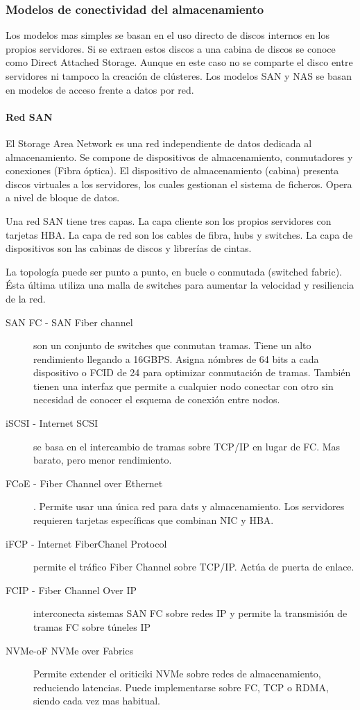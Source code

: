     \subsubsection{Modelos de conectividad del almacenamiento}
        Los modelos mas simples se basan en el uso directo de discos internos en los propios servidores. Si se extraen estos discos a una cabina de discos se conoce como Direct Attached Storage. Aunque en este caso no se comparte el disco entre servidores ni tampoco la creación de clústeres. Los modelos SAN y NAS se basan en modelos de acceso frente a datos por red.

        \paragraph{Red SAN}
            El Storage Area Network es una red independiente de datos dedicada al almacenamiento. Se compone de dispositivos de almacenamiento, conmutadores y conexiones (Fibra óptica). El dispositivo de almacenamiento (cabina) presenta discos virtuales a los servidores, los cuales gestionan el sistema de ficheros. Opera a nivel de bloque de datos.

            Una red SAN tiene tres capas. La capa cliente son los propios servidores con tarjetas HBA. La capa de red son los cables de fibra, hubs y switches. La capa de dispositivos son las cabinas de discos y librerías de cintas.

            La topología puede ser punto a punto, en bucle o conmutada (switched fabric). Ésta última utiliza una malla de switches para aumentar la velocidad y resiliencia de la red.

            \begin{description}
                \item[SAN FC - SAN Fiber channel] son un conjunto de switches que conmutan tramas. Tiene un alto rendimiento llegando a 16GBPS. Asigna nómbres de 64 bits a cada dispositivo o FCID de 24 para optimizar conmutación de tramas. También tienen una interfaz que permite a cualquier nodo conectar con otro sin necesidad de conocer el esquema de conexión entre nodos.
                \item[iSCSI - Internet SCSI] se basa en el intercambio de tramas sobre TCP/IP en lugar de FC. Mas barato, pero menor rendimiento.
                \item[FCoE - Fiber Channel over Ethernet]. Permite usar una única red para dats y almacenamiento. Los servidores requieren tarjetas específicas que combinan NIC y HBA.
                \item[iFCP - Internet FiberChanel Protocol] permite el tráfico Fiber Channel sobre TCP/IP. Actúa de puerta de enlace.
                \item[FCIP - Fiber Channel Over IP] interconecta sistemas SAN FC sobre redes IP y permite la transmisión de tramas FC sobre túneles IP
                \item[NVMe-oF NVMe over Fabrics] Permite extender el oriticiki NVMe sobre redes de almacenamiento, reduciendo latencias. Puede implementarse sobre FC, TCP o RDMA, siendo cada vez mas habitual.
            \end{description}

